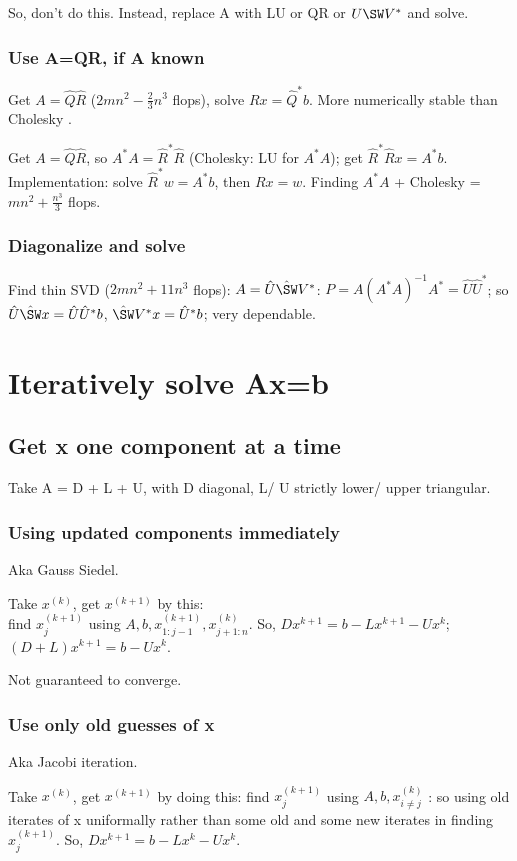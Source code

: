 \documentclass[oneside, article]{memoir}
\begin{document}
So, don't do this. Instead, replace A with LU or QR or $U\SW V^{*}$ and solve.

\subsection{Use A=QR, if A known}
Get $A=\hat{Q}\hat{R}$ ($2mn^{2} - \frac{2}{3}n^{3}$ flops), solve $Rx=\hat{Q}^{*}b$. More numerically stable than Cholesky \why.

Get $A=\hat{Q}\hat{R}$, so $A^{*}A = \hat{R}^{*}\hat{R}$ (Cholesky: LU for $A^{*}A$); get $\hat{R}^{*}\hat{R}x = A^{*}b$. Implementation: solve $\hat{R}^{*}w=A^{*}b$, then $Rx=w$. Finding $A^{*}A$ + Cholesky = $mn^{2} + \frac{n^{3}}{3}$ flops.

\subsection{Diagonalize and solve}
Find thin SVD ($2mn^{2} + 11n^{3}$ flops): $A=\hat{U}\hat{\SW}V^{*}$: $P=A(A^{*}A)^{-1} A^{*} = \hat{U}\hat{U}^{*}$; so $\hat{U}\hat{\SW}x = \hat{U}\hat{U}^{*}b$, $\hat{\SW}V^{*}x = \hat{U}^{*}b$; very dependable.

\chapter{Iteratively solve Ax=b}
\section{Get x one component at a time}
Take A = D + L + U, with D diagonal, L/ U strictly lower/ upper triangular.

\subsection{Using updated components immediately}
Aka Gauss Siedel.

Take $x^{(k)}$, get $x^{(k+1)}$ by this:\\
 find $x^{(k+1)}_{j}$ using $A, b, x^{(k+1)}_{1:j-1}, x^{(k)}_{j+1:n}$. So, $Dx^{k+1} = b - Lx^{k+1} - Ux^{k}$; $(D+L)x^{k+1} = b - Ux^{k}$.
 
Not guaranteed to converge.

\subsection{Use only old guesses of x}
Aka Jacobi iteration.

Take $x^{(k)}$, get $x^{(k+1)}$ by doing this: find $x^{(k+1)}_{j}$ using $A, b, x^{(k)}_{i\neq j}$ : so using old iterates of x uniformally rather than some old and some new iterates in finding $x^{(k+1)}_{j}$. So, $Dx^{k+1} = b - Lx^{k} - Ux^{k}$.
\end{document}
